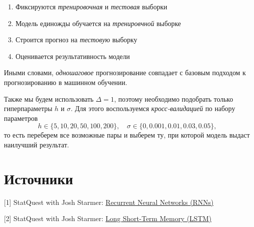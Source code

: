 \begin{enumerate}
\item Фиксируются \textit{тренировочная} и \textit{тестовая} выборки

\item Модель единожды обучается на \textit{тренировчной} выборке

\item Строится прогноз на \textit{тестовую} выборку

\item Оценивается результативность модели
\end{enumerate}

\vspace{-15pt}

Иными словами, \textit{одношаговое} прогнозирование совпадает с базовым подходом к прогнозированию в машинном обучении.

Также мы будем использовать $\Delta = 1$, поэтому необходимо подобрать только гиперпараметры $h$ и $\sigma$. Для этого воспользуемся \textit{кросс-валидацией} по набору параметров
\[
h \in \{ 5, 10, 20, 50, 100, 200 \}, \quad \sigma \in \{ 0, 0.001, 0.01, 0.03, 0.05 \},
\]
то есть переберем все возможные пары и выберем ту, при которой модель выдаст наилучший результат.







\section{Источники}

[1] StatQuest with Josh Starmer: \href{https://youtu.be/AsNTP8Kwu80?si=N-Snml3hPPGoP0i3}{Recurrent Neural Networks (RNNs)}

[2] StatQuest with Josh Starmer: \href{https://www.youtube.com/watch?v=YCzL96nL7j0&list=PLblh5JKOoLUIxGDQs4LFFD--41Vzf-ME1&index=16&ab_channel=StatQuestwithJoshStarmer}{Long Short-Term Memory (LSTM)}


